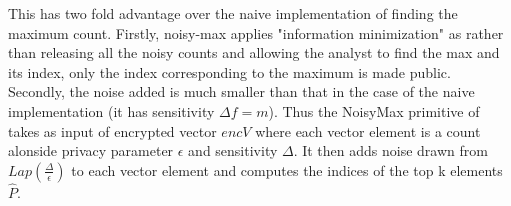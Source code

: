 	This has two fold advantage over the naive implementation of finding the maximum count.
Firstly, noisy-max applies "information minimization" as rather than releasing all the noisy counts
and allowing the analyst to find the max and its index, only the
index corresponding to the maximum is made public.
Secondly, the noise added is much smaller than that in the case of the naive implementation (it has sensitivity $\Delta f=m$). Thus the \textsf{NoisyMax} primitive of \system takes as input of encrypted vector $encV$ where each vector element is a count alonside privacy parameter $\epsilon$ and sensitivity $\Delta$. It then adds noise drawn from $Lap(\frac{\Delta}{\epsilon})$ to each vector element and computes the indices of the top k elements $\hat{P}$.


